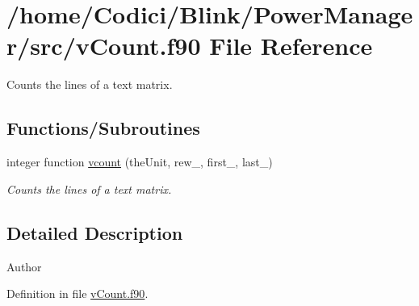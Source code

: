 \hypertarget{v_count_8f90}{\section{/home/\-Codici/\-Blink/\-Power\-Manager/src/v\-Count.f90 File Reference}
\label{v_count_8f90}
}


Counts the lines of a text matrix.  


\subsection*{Functions/\-Subroutines}
\begin{DoxyCompactItemize}
\item 
integer function \hyperlink{v_count_8f90_a64dfa04178ad3ed3519dbac3c8540a81}{vcount} (the\-Unit, rew\-\_\-, first\-\_\-, last\-\_\-)
\begin{DoxyCompactList}\small\item\em Counts the lines of a text matrix. \end{DoxyCompactList}\end{DoxyCompactItemize}


\subsection{Detailed Description}
\begin{DoxyAuthor}{Author}

\end{DoxyAuthor}


Definition in file \hyperlink{v_count_8f90_source}{v\-Count.\-f90}.



